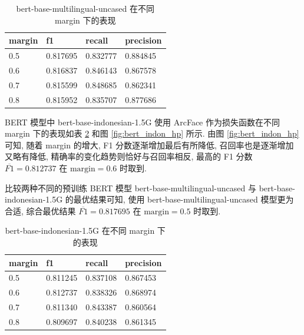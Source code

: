 \documentclass[12pt]{article}
\begin{document}
\begin{table}[htbp]
  \centering
  \caption{bert-base-multilingual-uncased 在不同 margin 下的表现}
  \label{tab:bert_multi_hp}
  \begin{tabular}{llll}
    \toprule
    margin & f1       & recall   & precision \\
    \midrule
    0.5 & 0.817695 & 0.832777 & 0.884845  \\
    0.6 & 0.816837 & 0.846143 & 0.867578  \\
    0.7 & 0.815599 & 0.848685 & 0.862341  \\
    0.8 & 0.815952 & 0.835707 & 0.877686  \\
    \bottomrule
  \end{tabular}
\end{table}

BERT 模型中 bert-base-indonesian-1.5G 使用 ArcFace 作为损失函数在不同 margin 下的表现如表 \ref{tab:bert_indon_hp} 和图 \ref{fig:bert_indon_hp} 所示. 由图 \ref{fig:bert_indon_hp} 可知, 随着 margin 的增大, F1 分数逐渐增加最后有所降低, 召回率也是逐渐增加又略有降低, 精确率的变化趋势则恰好与召回率相反, 最高的 F1 分数 $\overline{F1}=0.812737$ 在 $\text{margin} = 0.6$ 时取到.

比较两种不同的预训练 BERT 模型 bert-base-multilingual-uncased 与 bert-base-indonesian-1.5G 的最优结果可知, 使用 bert-base-multilingual-uncased 模型更为合适, 综合最优结果 $\overline{F1}=0.817695$ 在 $\text{margin} = 0.5$ 时取到.

\begin{table}[htbp]
  \centering
  \caption{bert-base-indonesian-1.5G 在不同 margin 下的表现}
  \label{tab:bert_indon_hp}
  \begin{tabular}{llll}
    \toprule
    margin & f1       & recall   & precision \\
    \midrule
    0.5 & 0.811245 & 0.837108 & 0.867453  \\
    0.6 & 0.812737 & 0.838326 & 0.868974  \\
    0.7 & 0.811340 & 0.843387 & 0.860564  \\
    0.8 & 0.809697 & 0.840238 & 0.861345  \\
    \bottomrule
  \end{tabular}
\end{table}
\end{document}
